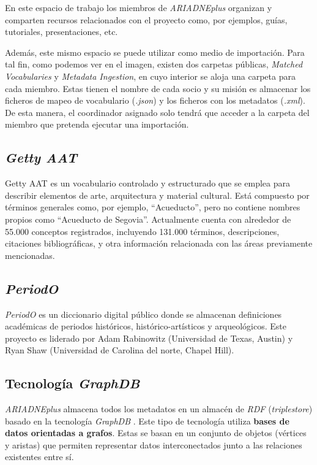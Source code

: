 En este espacio de trabajo los miembros de \emph{ARIADNEplus} organizan y
comparten recursos relacionados con el proyecto como, por ejemplos,
guías, tutoriales, presentaciones, etc.


Además, este mismo espacio se puede utilizar como medio de importación.
Para tal fin, como podemos ver en el imagen, existen dos carpetas
públicas, \emph{Matched Vocabularies} y \emph{Metadata Ingestion}, en
cuyo interior se aloja una carpeta para cada miembro. Estas tienen el
nombre de cada socio y su misión es almacenar los ficheros de mapeo de
vocabulario (\emph{.json}) y los ficheros con los metadatos
(\emph{.xml}). De esta manera, el coordinador asignado solo tendrá que
acceder a la carpeta del miembro que pretenda ejecutar una importación.

\subsection{\emph{Getty AAT}}

Getty AAT \cite{weboff:dfourwork} es un vocabulario controlado y
estructurado que se emplea para describir elementos de arte,
arquitectura y material cultural. Está compuesto por términos generales
como, por ejemplo, ``Acueducto'', pero no contiene nombres propios como
``Acueducto de Segovia''. Actualmente cuenta con alrededor de 55.000
conceptos registrados, incluyendo 131.000 términos, descripciones,
citaciones bibliográficas, y otra información relacionada con las áreas
previamente mencionadas.

\subsection{\emph{PeriodO}}

\emph{PeriodO} \cite{weboff:getty} es un
diccionario digital público donde se almacenan definiciones académicas
de periodos históricos, histórico-artísticos y arqueológicos. Este
proyecto es liderado por Adam Rabinowitz (Universidad de Texas, Austin)
y Ryan Shaw (Universidad de Carolina del norte, Chapel Hill).

\subsection{Tecnología \emph{GraphDB}}

\emph{ARIADNEplus} almacena todos los metadatos en un almacén de \emph{RDF}
(\emph{triplestore}) basado en la tecnología \emph{GraphDB} \cite{weboff:gdb}. 
Este tipo de tecnología utiliza \textbf{bases de datos orientadas a grafos}. Estas se
basan en un conjunto de objetos (vértices y aristas) que permiten
representar datos interconectados junto a las relaciones existentes
entre sí. 

